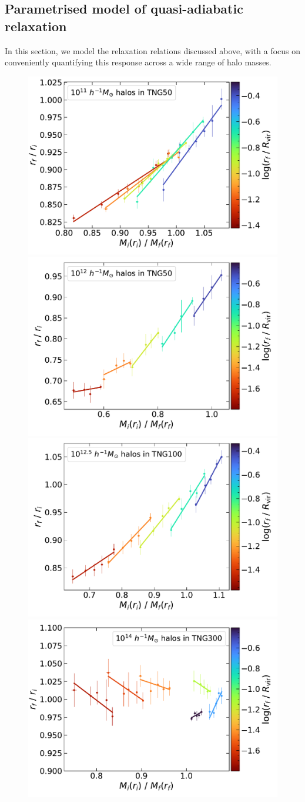 \subsection{Parametrised model of quasi-adiabatic relaxation}
\label{sec:results-rad-dep-qadiab-ch:simbase}
In this section, we model the relaxation relations discussed above, with a focus on conveniently quantifying this response across a wide range of halo masses.

\begin{figure}
    \centering
    \includegraphics[width=0.48\linewidth]{plots/fit_show_rf_M_T50_M11.pdf}
    \includegraphics[width=0.48\linewidth]{plots/fit_show_rf_M_T50_M12.pdf}
    \includegraphics[width=0.48\linewidth]{plots/fit_show_rf_M_T100_M12.5.pdf}
    \includegraphics[width=0.48\linewidth]{plots/fit_show_rf_M_T300_M14.pdf}

\end{figure}
